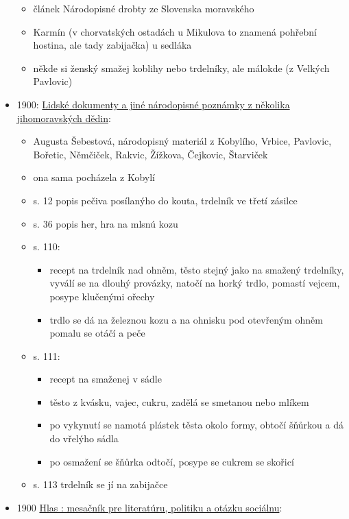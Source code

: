 \begin{itemize}
  \begin{itemize}
  \tightlist
  \item
    článek Národopisné drobty ze Slovenska moravského
  \item
    Karmín (v chorvatských ostadách u Mikulova to znamená pohřební
    hostina, ale tady zabijačka) u sedláka
  \item
    někde si ženský smažej koblihy nebo trdelníky, ale málokde (z
    Velkých Pavlovic)
  \end{itemize}
\item
  1900:
  \href{https://ndk.cz/view/uuid:7d517d10-0583-11dd-85d4-000d606f5dc6?page=uuid\%3A445fd636-253c-4b04-b533-3b0a96e7e0b4}{
  Lidské dokumenty a jiné národopisné poznámky z několika jihomoravských
  dědin}:

  \begin{itemize}
  \tightlist
  \item
    Augusta Šebestová, národopisný materiál z Kobylího, Vrbice,
    Pavlovic, Bořetic, Němčiček, Rakvic, Žížkova, Čejkovic, Štarviček
  \item
    ona sama pocházela z Kobylí
  \item
    s. 12 popis pečiva posílanýho do kouta, trdelník ve třetí zásilce
  \item
    s. 36 popis her, hra na mlsnú kozu
  \item
    s. 110:

    \begin{itemize}
    \tightlist
    \item
      recept na trdelník nad ohněm, těsto stejný jako na smažený
      trdelníky, vyválí se na dlouhý provázky, natočí na horký trdlo,
      pomastí vejcem, posype klučenými ořechy
    \item
      trdlo se dá na železnou kozu a na ohnisku pod otevřeným ohněm
      pomalu se otáčí a peče
    \end{itemize}
  \item
    s. 111:

    \begin{itemize}
    \tightlist
    \item
      recept na smaženej v sádle
    \item
      těsto z kvásku, vajec, cukru, zadělá se smetanou nebo mlíkem
    \item
      po vykynutí se namotá plástek těsta okolo formy, obtočí šňůrkou a
      dá do vřelýho sádla
    \item
      po osmažení se šňůrka odtočí, posype se cukrem se skořicí
    \end{itemize}
  \item
    s. 113 trdelník se jí na zabijačce
  \end{itemize}
\item
  1900
  \href{https://dikda.snk.sk/uuid/uuid:7f57fb99-b746-49c2-9b31-a09b7a646c02}{Hlas
  : mesačník pre literatúru, politiku a otázku sociálnu}:


\end{itemize}
